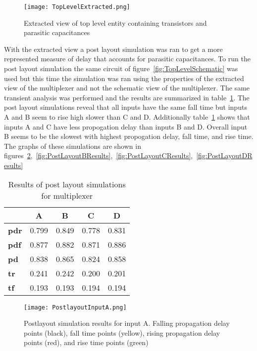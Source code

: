 \documentclass[conference]{IEEEtran}
\begin{document}
  \begin{figure}[H]
  \center
    \texttt{[image: TopLevelExtracted.png]}
    \caption{Extracted view of top level entity containing transistors and parasitic capacitances}
    \label{fig:TopLevelExtracted}
  \end{figure} 

  With the extracted view a post layout simulation was ran to get a more represented measure of delay that accounts for parasitic capacitances. To run the post layout simulation the same circuit of figure~\ref{fig:TopLevelSchematic} was used but this time the simulation was ran using the properties of the extracted view of the multiplexer and not the schematic view of the multiplexer. The same transient analysis was performed and the results are summarized in table~\ref{tab:postlayoutsim}. The post layout simulations reveal that all inputs have the same fall time but inputs A and B seem to rise high slower than C and D. Additionally table~\ref{tab:postlayoutsim} shows that inputs A and C have less propogation delay than inputs B and D. Overall input B seems to be the slowest with highest propogation delay, fall time, and rise time. The graphs of these simulations are shown in figures~\ref{fig:PostLayoutAResults},~\ref{fig:PostLayoutBResults},~\ref{fig:PostLayoutCResults},~\ref{fig:PostLayoutDResults}


  \begin{table}[H]
  \center
\begin{tabular}{|l|c|c|c|c|}
\hline
             & \textbf{A} & \textbf{B} & \textbf{C} & \textbf{D} \\ \hline
\textbf{pdr} & 0.799      & 0.849      & 0.778      & 0.831      \\ \hline
\textbf{pdf} & 0.877      & 0.882      & 0.871      & 0.886      \\ \hline
\textbf{pd}  & 0.838      & 0.865      & 0.824      & 0.858      \\ \hline
\textbf{tr}  & 0.241      & 0.242      & 0.200      & 0.201      \\ \hline
\textbf{tf}  & 0.193      & 0.193      & 0.194      & 0.194      \\ \hline
\end{tabular}
\caption{Results of post layout simulations for multiplexer}
\label{tab:postlayoutsim}
\end{table}

  \begin{figure}[H]
  \center
    \texttt{[image: PostlayoutInputA.png]}
    \caption{Postlayout simulation results for input A. Falling propagation delay points (black), fall time points (yellow), rising propagation delay points (red), and rise time points (green)}
    \label{fig:PostLayoutAResults}
  \end{figure} 
\end{document}
